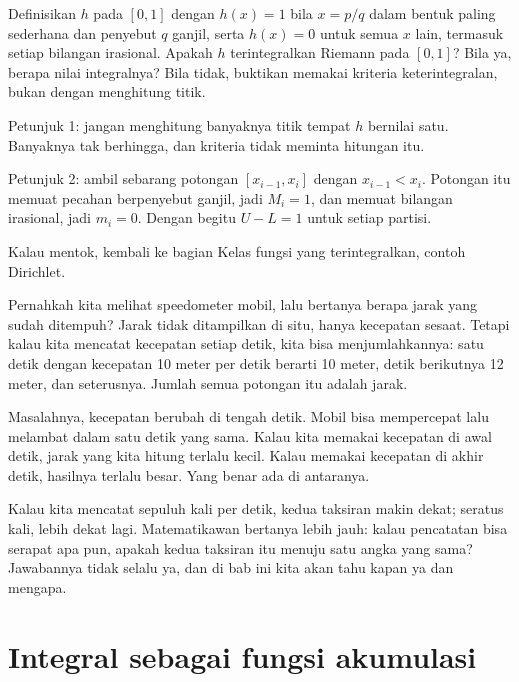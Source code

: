 \begin{tantangan}
Definisikan $h$ pada $[0,1]$ dengan $h(x)=1$ bila $x=p/q$ dalam bentuk paling sederhana
dan penyebut $q$ ganjil, serta $h(x)=0$ untuk semua $x$ lain, termasuk setiap bilangan
irasional. Apakah $h$ terintegralkan Riemann pada $[0,1]$? Bila ya, berapa nilai
integralnya? Bila tidak, buktikan memakai kriteria keterintegralan, bukan dengan
menghitung titik.

Petunjuk 1: jangan menghitung banyaknya titik tempat $h$ bernilai satu. Banyaknya tak
berhingga, dan kriteria tidak meminta hitungan itu.

Petunjuk 2: ambil sebarang potongan $[x_{i-1},x_i]$ dengan $x_{i-1}<x_i$. Potongan itu
memuat pecahan berpenyebut ganjil, jadi $M_i=1$, dan memuat bilangan irasional, jadi
$m_i=0$. Dengan begitu $U-L=1$ untuk setiap partisi.

Kalau mentok, kembali ke bagian Kelas fungsi yang terintegralkan, contoh Dirichlet.
\end{tantangan}


\begin{untukanak}
Pernahkah kita melihat speedometer mobil, lalu bertanya berapa jarak yang sudah
ditempuh? Jarak tidak ditampilkan di situ, hanya kecepatan sesaat. Tetapi kalau kita
mencatat kecepatan setiap detik, kita bisa menjumlahkannya: satu detik dengan
kecepatan 10 meter per detik berarti 10 meter, detik berikutnya 12 meter, dan
seterusnya. Jumlah semua potongan itu adalah jarak.

Masalahnya, kecepatan berubah di tengah detik. Mobil bisa mempercepat lalu melambat
dalam satu detik yang sama. Kalau kita memakai kecepatan di awal detik, jarak yang
kita hitung terlalu kecil. Kalau memakai kecepatan di akhir detik, hasilnya terlalu
besar. Yang benar ada di antaranya.

Kalau kita mencatat sepuluh kali per detik, kedua taksiran makin dekat; seratus kali,
lebih dekat lagi. Matematikawan bertanya lebih jauh: kalau pencatatan bisa serapat apa
pun, apakah kedua taksiran itu menuju satu angka yang sama? Jawabannya tidak selalu ya,
dan di bab ini kita akan tahu kapan ya dan mengapa.
\end{untukanak}

\section{Integral sebagai fungsi akumulasi}

